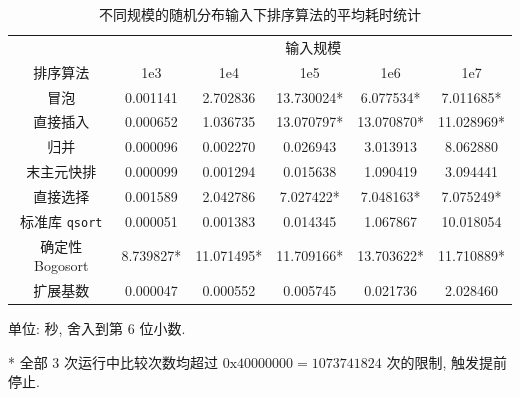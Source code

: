 \documentclass[12pt]{article}
\begin{document}
\begin{table}
\centering
\begin{threeparttable}
    \caption{不同规模的随机分布输入下排序算法的平均耗时统计}
    \begin{tabular}{cccccc}
        \toprule
         & \multicolumn{5}{c}{输入规模} \\
        排序算法 & 1e3 & 1e4 & 1e5 & 1e6 & 1e7 \\
        \midrule
        冒泡 & 0.001141 & 2.702836 & 13.730024* & 6.077534* & 7.011685* \\
        直接插入 & 0.000652 & 1.036735 & 13.070797* & 13.070870* & 11.028969* \\
        归并 & 0.000096 & 0.002270 & 0.026943 & 3.013913 & 8.062880 \\
        末主元快排 & 0.000099 & 0.001294 & 0.015638 & 1.090419 & 3.094441 \\
        直接选择 & 0.001589 & 2.042786 & 7.027422* & 7.048163* & 7.075249* \\
        标准库 \texttt{qsort} & 0.000051 & 0.001383 & 0.014345 & 1.067867 & 10.018054 \\
        确定性 Bogosort & 8.739827* & 11.071495* & 11.709166* & 13.703622* & 11.710889* \\
        扩展基数 & 0.000047 & 0.000552 & 0.005745 & 0.021736 & 2.028460 \\
        \bottomrule
    \end{tabular}
    \begin{tablenotes}
        \small
        \item 单位: 秒, 舍入到第 6 位小数.
        \item[*] 全部 3 次运行中比较次数均超过 $0\mathrm{x}40000000 = 1073741824$ 次的限制, 触发提前停止.
    \end{tablenotes}
    \label{table_result_random}
\end{threeparttable}
\end{table}
\end{document}
